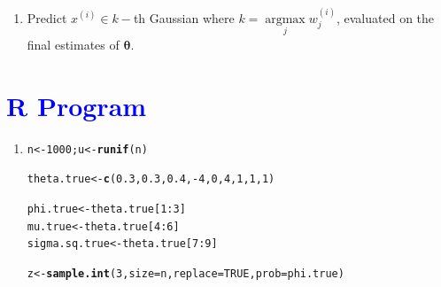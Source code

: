 \documentclass[11pt, a4paper]{article}\usepackage[]{graphicx}\usepackage[]{xcolor}
\makeatletter
\newcommand{\hlnum}[1]{\textcolor[rgb]{0.686,0.059,0.569}{#1}}%
\newcommand{\hlopt}[1]{\textcolor[rgb]{0,0,0}{#1}}%
\newcommand{\hldef}[1]{\textcolor[rgb]{0.345,0.345,0.345}{#1}}%
\newcommand{\hlkwb}[1]{\textcolor[rgb]{0.69,0.353,0.396}{#1}}%
\newcommand{\hlkwc}[1]{\textcolor[rgb]{0.333,0.667,0.333}{#1}}%
\newcommand{\hlkwd}[1]{\textcolor[rgb]{0.737,0.353,0.396}{\textbf{#1}}}%
\newenvironment{kframe}{%
 \def\at@end@of@kframe{}%
 \ifinner\ifhmode%
  \def\at@end@of@kframe{\end{minipage}}%
  \begin{minipage}{\columnwidth}%
 \fi\fi%
 \def\FrameCommand##1{\hskip\@totalleftmargin \hskip-\fboxsep
 \colorbox{shadecolor}{##1}\hskip-\fboxsep
     \hskip-\linewidth \hskip-\@totalleftmargin \hskip\columnwidth}%
 \MakeFramed {\advance\hsize-\width
   \@totalleftmargin\z@ \linewidth\hsize
   \@setminipage}}%
 {\par\unskip\endMakeFramed%
 \at@end@of@kframe}
\newenvironment{knitrout}{}{} %
\newcommand{\bs}[1]{\boldsymbol{#1}}
\makeatother
\begin{document}
\begin{enumerate}
\begin{itemize}
$\left. \right\}$.
\end{itemize}

\item[\scalebox{2.0}{\twemoji{keycap: 3}}] \hspace{0.2cm} Predict $x^{(i)} \in k-$th Gaussian where $k = \operatorname*{argmax}\limits_{j} w_{j}^{(i)}$, evaluated on the final estimates of $\bs{\theta}$.
\end{enumerate}

\section*{\faArrowAltCircleRight[regular] \textcolor{blue}{R Program}}





\begin{enumerate}

\item[\scalebox{2.0}{\twemoji{keycap: 1}}]

\begin{knitrout}
\color{fgcolor}\begin{kframe}
\begin{alltt}
\hldef{n} \hlkwb{<-} \hlnum{1000}\hldef{; u} \hlkwb{<-} \hlkwd{runif}\hldef{(n)}
\end{alltt}
\end{kframe}
\end{knitrout}

\begin{knitrout}
\color{fgcolor}\begin{kframe}
\begin{alltt}
\hldef{theta.true} \hlkwb{<-} \hlkwd{c}\hldef{(}\hlnum{0.3}\hldef{,} \hlnum{0.3}\hldef{,} \hlnum{0.4}\hldef{,} \hlopt{-}\hlnum{4}\hldef{,} \hlnum{0}\hldef{,} \hlnum{4}\hldef{,} \hlnum{1}\hldef{,} \hlnum{1}\hldef{,} \hlnum{1}\hldef{)}

\hldef{phi.true} \hlkwb{<-} \hldef{theta.true[}\hlnum{1}\hlopt{:}\hlnum{3}\hldef{]}
\hldef{mu.true} \hlkwb{<-} \hldef{theta.true[}\hlnum{4}\hlopt{:}\hlnum{6}\hldef{]}
\hldef{sigma.sq.true} \hlkwb{<-} \hldef{theta.true[}\hlnum{7}\hlopt{:}\hlnum{9}\hldef{]}
\end{alltt}
\end{kframe}
\end{knitrout}

\begin{knitrout}
\color{fgcolor}\begin{kframe}
\begin{alltt}
\hldef{z} \hlkwb{<-} \hlkwd{sample.int}\hldef{(}\hlnum{3}\hldef{,} \hlkwc{size} \hldef{= n,} \hlkwc{replace} \hldef{=} \hlnum{TRUE}\hldef{,} \hlkwc{prob} \hldef{= phi.true)}
\end{alltt}
\end{kframe}
\end{knitrout}


\end{enumerate}
\end{document}
